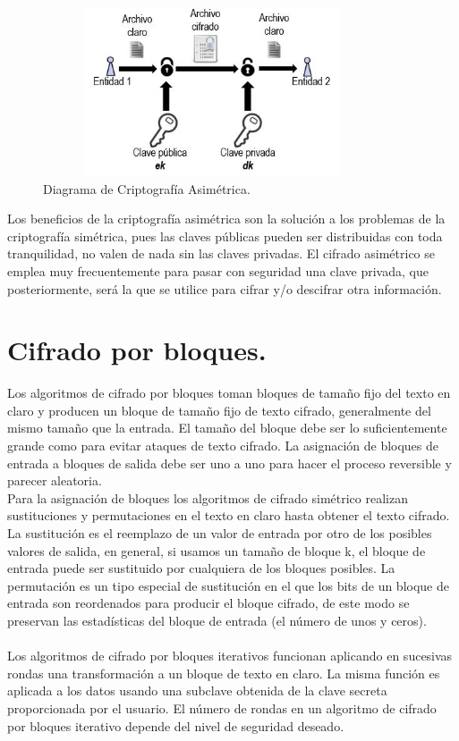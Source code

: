 \begin{figure}[H]
\centering
	\includegraphics[width=10cm, height=5cm]{./images/Cripto_Asimetrica.jpg}
	\caption{Diagrama de Criptografía Asimétrica.}
	\label{fig:2-4-1}
\end{figure}

 Los beneficios de la criptografía asimétrica son la solución a los problemas de la criptografía simétrica, pues las claves públicas pueden ser distribuidas con toda tranquilidad, no valen de nada sin las claves privadas. El cifrado asimétrico se emplea muy frecuentemente para pasar con seguridad una clave privada, que posteriormente, será la que se utilice para cifrar y/o descifrar otra información.

\section{Cifrado por bloques. }
Los algoritmos de cifrado por bloques toman bloques de tamaño fijo del texto en claro y producen un bloque de tamaño fijo de texto cifrado, generalmente del mismo tamaño que la entrada. El tamaño del bloque debe ser lo suficientemente grande como para evitar ataques de texto cifrado. La asignación de bloques de entrada a bloques de salida debe ser uno a uno para hacer el proceso reversible y parecer aleatoria.\\ 
Para la asignación de bloques los algoritmos de cifrado simétrico realizan sustituciones y permutaciones en el texto en claro hasta obtener el texto cifrado.\\ 
La sustitución es el reemplazo de un valor de entrada por otro de los posibles valores de salida, en general, si usamos un tamaño de bloque k, el bloque de entrada puede ser sustituido por cualquiera de los bloques posibles.
La permutación es un tipo especial de sustitución en el que los bits de un bloque de entrada son reordenados para producir el bloque cifrado, de este modo se preservan las estadísticas del bloque de entrada (el número de unos y ceros). \\ \\  Los algoritmos de cifrado por bloques iterativos funcionan aplicando en sucesivas rondas una transformación a un bloque de texto en claro. La misma función es aplicada a los datos usando una subclave obtenida de la clave secreta proporcionada por el usuario. El número de rondas en un algoritmo de cifrado por bloques iterativo depende del nivel de seguridad deseado.

